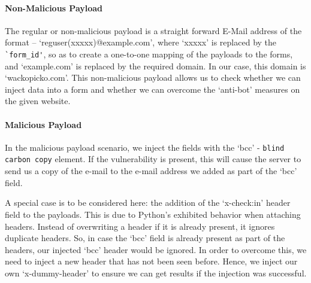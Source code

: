 \paragraph{Non-Malicious Payload}
\label{Comp:Fuzzer:nmp}
The regular or non-malicious payload is a straight forward E-Mail address of the format -- `reguser(xxxxx)@example.com', where `xxxxx' is replaced by the \lstinline{`form_id'}, so as to create a one-to-one mapping of the payloads to the forms, and `example.com' is replaced by the required domain. In our case, this domain is `wackopicko.com'.
This non-malicious payload allows us to check whether we can inject data into a form and whether we can overcome the `anti-bot' measures on the given website.

\paragraph{Malicious Payload}
\label{Comp:Fuzzer:mp}
In the malicious payload scenario, we inject the fields with the `bcc' - \lstinline{blind carbon copy} element. If the vulnerability is present, this will cause the server to send us a copy of the e-mail to the e-mail address we added as part of the `bcc' field.

A special case is to be considered here: the addition of the `x-check:in' header field to the payloads. This is due to Python's exhibited behavior when attaching
headers. Instead of overwriting a header if it is already present, it ignores duplicate headers. So, in case the `bcc' field is already present as part of the headers, our injected `bcc' header would be ignored. In order to overcome this, we need to inject a new header that has not been seen before. Hence, we inject our own `x-dummy-header' to ensure we can get results if the injection was successful.

